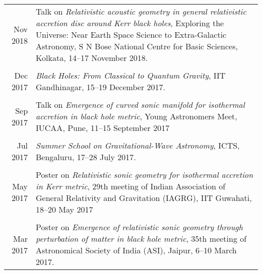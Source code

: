\documentclass[12pt]{article}
\begin{document}
\begin{longtable}{rp{14cm}}
Nov 2018 & {Talk} on {\itshape Relativistic acoustic geometry in general relativistic accretion disc around Kerr black holes}, Exploring the Universe: Near Earth Space Science to Extra-Galactic Astronomy, S N Bose National Centre for Basic Sciences, Kolkata, 14–17 November 2018.\\\\

Dec 2017 & {\itshape Black Holes: From Classical to Quantum Gravity}, IIT Gandhinagar, 15–19 December 2017.\\\\

Sep 2017 & {Talk} on {\itshape Emergence of curved sonic manifold for isothermal accretion in black hole metric}, Young Astronomers Meet, IUCAA, Pune, 11–15 September 2017\\\\

Jul 2017 & {\itshape Summer School on Gravitational-Wave Astronomy}, ICTS, Bengaluru, 17–28 July 2017.\\\\

May 2017 & {Poster} on {\itshape Relativistic sonic geometry for isothermal accretion in Kerr metric}, 29th meeting of Indian Association of General Relativity and Gravitation (IAGRG), IIT Guwahati, 18–20 May 2017\\\\

Mar 2017 & {Poster} on {\itshape Emergence of relativistic sonic geometry through perturbation of matter in black hole metric}, 35th meeting of Astronomical Society of India (ASI), Jaipur, 6–10 March 2017.
\end{longtable}
\end{document}
